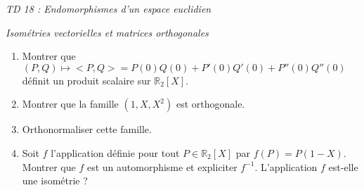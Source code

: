 \documentclass[a4paper,10pt]{report}
\begin{document}
\everymath{\displaystyle}

\begin{center}
\textit{{ {\huge TD 18 : Endomorphismes d'un espace euclidien}}}
\end{center}

\medskip

\medskip

\begin{center}
\textit{{ {\large Isométries vectorielles et matrices orthogonales}}}
\end{center}

\medskip

\begin{Exa} 
\begin{enumerate}
\item Montrer que $(P,Q) \mapsto <P,Q> = P(0)Q(0)+ P'(0)Q'(0)+P''(0)Q''(0)$ définit un produit scalaire sur $\mathbb{R}_2[X]$.
\item Montrer que la famille $(1,X,X^2)$ est orthogonale.
\item Orthonormaliser cette famille.
\item Soit $f$ l'application définie pour tout $P \in \mathbb{R}_2[X]$ par $f(P)=P(1-X)$. Montrer que $f$ est un automorphisme et expliciter $f^{-1}$. L'application $f$ est-elle une isométrie ?
\end{enumerate}
\end{Exa}
\end{document}
